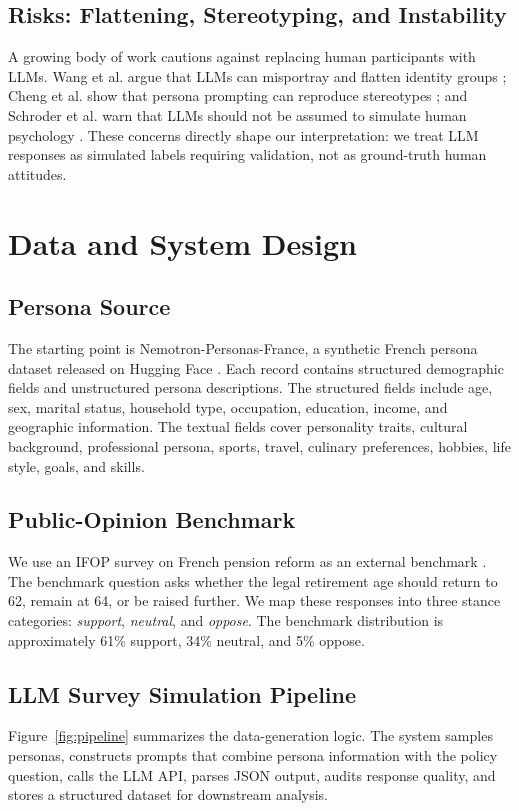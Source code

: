 ﻿\documentclass[sigconf,nonacm]{acmart}
\newcommand{\dataset}{Nemotron-Personas-France}
\newcommand{\ifop}{IFOP}
\begin{document}
\subsection{Risks: Flattening, Stereotyping, and Instability}
A growing body of work cautions against replacing human participants with LLMs. Wang et al. argue that LLMs can misportray and flatten identity groups \cite{wang2024replace}; Cheng et al. show that persona prompting can reproduce stereotypes \cite{cheng2023marked}; and Schroder et al. warn that LLMs should not be assumed to simulate human psychology \cite{schroder2025psychology}. These concerns directly shape our interpretation: we treat LLM responses as simulated labels requiring validation, not as ground-truth human attitudes.

\section{Data and System Design}
\subsection{Persona Source}
The starting point is \dataset{}, a synthetic French persona dataset released on Hugging Face \cite{nvidia2024nemotron}. Each record contains structured demographic fields and unstructured persona descriptions. The structured fields include age, sex, marital status, household type, occupation, education, income, and geographic information. The textual fields cover personality traits, cultural background, professional persona, sports, travel, culinary preferences, hobbies, life style, goals, and skills.

\subsection{Public-Opinion Benchmark}
We use an \ifop{} survey on French pension reform as an external benchmark \cite{ifop2023pension}. The benchmark question asks whether the legal retirement age should return to 62, remain at 64, or be raised further. We map these responses into three stance categories: \textit{support}, \textit{neutral}, and \textit{oppose}. The benchmark distribution is approximately 61\% support, 34\% neutral, and 5\% oppose.

\subsection{LLM Survey Simulation Pipeline}
Figure~\ref{fig:pipeline} summarizes the data-generation logic. The system samples personas, constructs prompts that combine persona information with the policy question, calls the LLM API, parses JSON output, audits response quality, and stores a structured dataset for downstream analysis.
\end{document}
